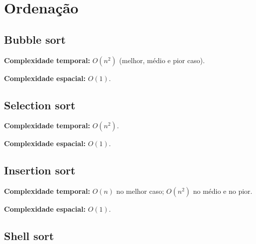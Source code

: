 \chapter{Ordenação}

\section{Bubble sort}

\textbf{Complexidade temporal:} $O(n^2)$ (melhor, médio e pior caso).

\textbf{Complexidade espacial:} $O(1)$.


\section{Selection sort}

\textbf{Complexidade temporal:} $O(n^2)$.

\textbf{Complexidade espacial:} $O(1)$.


\section{Insertion sort}

\textbf{Complexidade temporal:} $O(n)$ no melhor caso; $O(n^2)$ no médio e no pior.

\textbf{Complexidade espacial:} $O(1)$.


\section{Shell sort}

